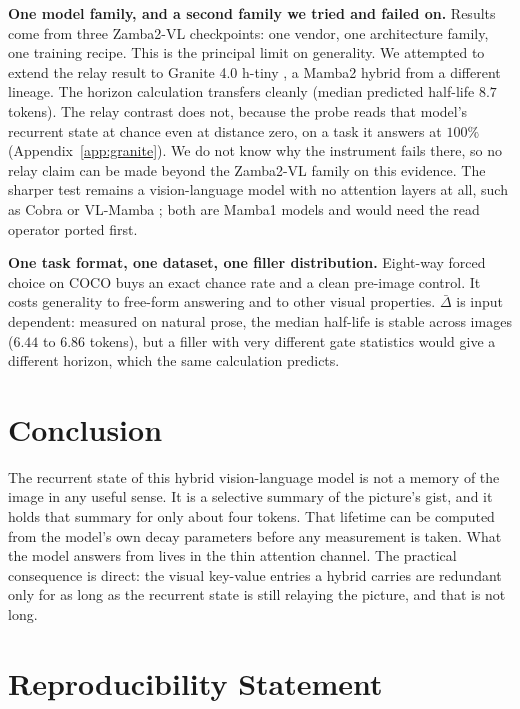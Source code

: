 \documentclass{article}
\begin{document}
\textbf{One model family, and a second family we tried and failed on.} Results
come from three Zamba2-VL checkpoints: one vendor, one architecture family,
one training recipe. This is the principal limit on generality. We attempted
to extend the relay result to Granite 4.0 h-tiny \citep{granite4}, a Mamba2
hybrid from a different lineage. The horizon calculation transfers cleanly
(median predicted half-life $8.7$ tokens). The relay contrast does not,
because the probe reads that model's recurrent state at chance even at
distance zero, on a task it answers at $100\%$ (Appendix~\ref{app:granite}).
We do not know why the instrument fails there, so no relay claim can be made
beyond the Zamba2-VL family on this evidence. The sharper test remains a
vision-language model with no attention layers at all, such as Cobra
\citep{zhao2025cobra} or VL-Mamba \citep{qiao2024vlmamba}; both are Mamba1
models and would need the read operator ported first.

\textbf{One task format, one dataset, one filler distribution.} Eight-way
forced choice on COCO buys an exact chance rate and a clean pre-image control.
It costs generality to free-form answering and to other visual properties.
$\bar{\Delta}$ is input dependent: measured on natural prose, the median
half-life is stable across images ($6.44$ to $6.86$ tokens), but a filler with
very different gate statistics would give a different horizon, which the same
calculation predicts.

\section{Conclusion}

The recurrent state of this hybrid vision-language model is not a memory of
the image in any useful sense. It is a selective summary of the picture's
gist, and it holds that summary for only about four tokens. That lifetime can
be computed from the model's own decay parameters before any measurement is
taken. What the model answers from lives in the thin attention channel. The
practical consequence is direct: the visual key-value entries a hybrid carries
are redundant only for as long as the recurrent state is still relaying the
picture, and that is not long.

\section*{Reproducibility Statement}
\end{document}
